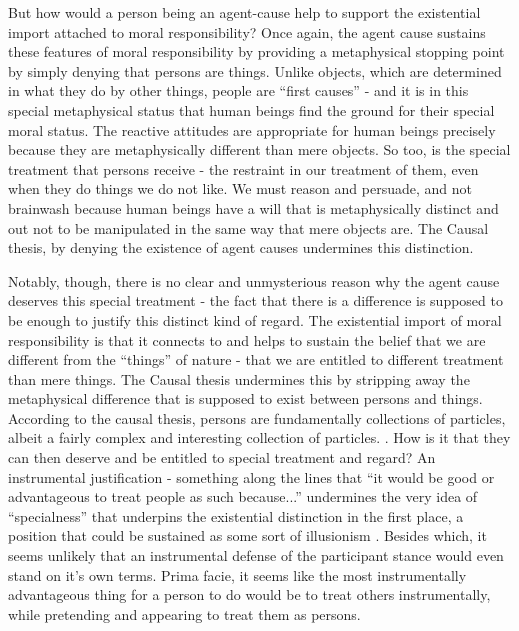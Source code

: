 \documentclass[phd,12pt,oneside,paper=letterpaper]{ubcthesis}
\begin{document}
But how would a person being an agent-cause help to support the existential import attached to moral responsibility? Once again, the agent cause sustains these features of moral responsibility by providing a metaphysical stopping point by simply denying that persons are things. Unlike objects, which are determined in what they do by other things, people are ``first causes'' - and it is in this special metaphysical status that human beings find the ground for their special moral status. The reactive attitudes are appropriate for human beings precisely because they are metaphysically different than mere objects. So too, is the special treatment that persons receive - the restraint in our treatment of them, even when they do things we do not like. We must reason and persuade, and not brainwash because human beings have a will that is metaphysically distinct and out not to be manipulated in the same way that mere objects are. The Causal thesis, by denying the existence of agent causes undermines this distinction.

Notably, though, there is no clear and unmysterious reason why the agent cause deserves this special treatment - the fact that there is a difference is supposed to be enough to justify this distinct kind of regard. The existential import of moral responsibility is that it connects to and helps to sustain the belief that we are different from the ``things'' of nature - that we are entitled to different treatment than mere things. The Causal thesis undermines this by stripping away the metaphysical difference that is supposed to exist between persons and things. According to the causal thesis, persons are fundamentally collections of particles, albeit a fairly complex and interesting collection of particles. \citep{sellars1962}. How is it that they can then deserve and be entitled to special treatment and regard? An instrumental justification - something along the lines that ``it would be good or advantageous to treat people as such because...'' undermines the very idea of ``specialness'' that underpins the existential distinction in the first place, a position that could be sustained as some sort of illusionism \citep{smilansky2000}. Besides which, it seems unlikely that an instrumental defense of the participant stance would even stand on it's own terms. Prima facie, it seems like the most instrumentally advantageous thing for a person to do would be to treat others instrumentally, while pretending and appearing to treat them as persons. 
\end{document}
